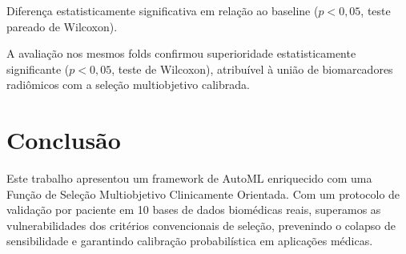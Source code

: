 \documentclass[conference]{IEEEtran}
\begin{document}
\begin{table}[htbp]
\caption{Comparação Pareada entre o BioStatusIA e Baselines Locais (Mesmas 5 Partições)}
\label{tab:literature_comp}
\centering
{}
\vspace{1mm}
\footnotesize{\newline * Diferença estatisticamente significativa em relação ao baseline ($p < 0{,}05$, teste pareado de Wilcoxon).}
\end{table}

A avaliação nos mesmos folds confirmou superioridade estatisticamente significante ($p < 0{,}05$, teste de Wilcoxon), atribuível à união de biomarcadores radiômicos com a seleção multiobjetivo calibrada.

\section{Conclusão}
Este trabalho apresentou um framework de AutoML enriquecido com uma Função de Seleção Multiobjetivo Clinicamente Orientada. Com um protocolo de validação por paciente em 10 bases de dados biomédicas reais, superamos as vulnerabilidades dos critérios convencionais de seleção, prevenindo o colapso de sensibilidade e garantindo calibração probabilística em aplicações médicas.
\end{document}
